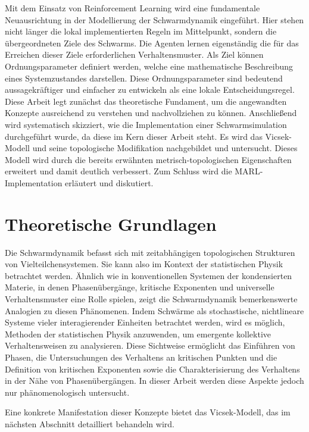 \documentclass{solutionclass}
\begin{document}
Mit dem Einsatz von Reinforcement Learning wird eine fundamentale Neuausrichtung in der Modellierung der Schwarmdynamik eingeführt. Hier stehen nicht länger die lokal implementierten Regeln im Mittelpunkt, sondern die übergeordneten Ziele des Schwarms. Die Agenten lernen eigenständig die für das Erreichen dieser Ziele erforderlichen Verhaltensmuster. Als Ziel können Ordnungsparameter definiert werden, welche eine mathematische Beschreibung eines Systemzustandes darstellen. Diese Ordnungsparameter sind bedeutend aussagekräftiger und einfacher zu entwickeln als eine lokale Entscheidungsregel.\\

Diese Arbeit legt zunächst das theoretische Fundament, um die angewandten Konzepte ausreichend zu verstehen und nachvollziehen zu können. Anschließend wird systematisch skizziert, wie die Implementation einer Schwarmsimulation durchgeführt wurde, da diese im Kern dieser Arbeit steht. Es wird das Vicsek-Modell und seine topologische Modifikation nachgebildet und untersucht. Dieses Modell wird durch die bereits erwähnten metrisch-topologischen Eigenschaften erweitert und damit deutlich verbessert. Zum Schluss wird die MARL-Implementation erläutert und diskutiert.

\newpage

\section{Theoretische Grundlagen}
Die Schwarmdynamik befasst sich mit zeitabhängigen topologischen Strukturen von Vielteilchensystemen. Sie kann also im Kontext der statistischen Physik betrachtet werden. Ähnlich wie in konventionellen Systemen der kondensierten Materie, in denen Phasenübergänge, kritische Exponenten und universelle Verhaltensmuster eine Rolle spielen, zeigt die Schwarmdynamik bemerkenswerte Analogien zu diesen Phänomenen. Indem Schwärme als stochastische, nichtlineare Systeme vieler interagierender Einheiten betrachtet werden, wird es möglich, Methoden der statistischen Physik anzuwenden, um emergente kollektive Verhaltensweisen zu analysieren. Diese Sichtweise ermöglicht das Einführen von Phasen, die Untersuchungen des Verhaltens an kritischen Punkten und die Definition von kritischen Exponenten sowie die Charakterisierung des Verhaltens in der Nähe von Phasenübergängen. In dieser Arbeit werden diese Aspekte jedoch nur phänomenologisch untersucht.

Eine konkrete Manifestation dieser Konzepte bietet das Vicsek-Modell, das im nächsten Abschnitt detailliert behandeln wird. 
\end{document}
